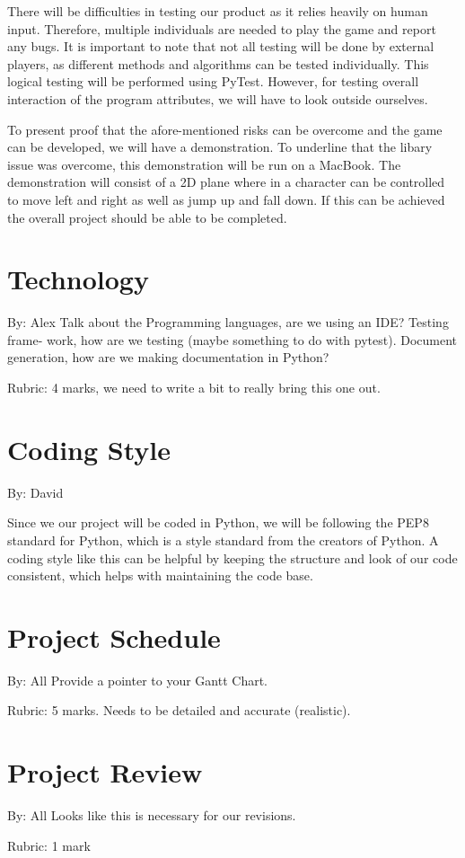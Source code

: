 \documentclass{article}
\begin{document}
There will be difficulties in testing our product as it relies heavily on human
input. Therefore, multiple individuals are needed to play the game and report
any bugs. It is important to note that not all testing will be done by external
players, as different methods and algorithms can be tested individually. This
logical testing will be performed using PyTest. However, for testing overall
interaction of the program attributes, we will have to look outside ourselves.

To present proof that the afore-mentioned risks can be overcome and the game can
be developed, we will have a demonstration. To underline that the libary issue
was overcome, this demonstration will be run on a MacBook. The demonstration
will consist of a 2D plane where in a character can be controlled to move left
and right as well as jump up and fall down. If this can be achieved the overall project should be able to be completed.

\section{Technology}
By: Alex
Talk  about  the  Programming  languages,  are  we  using  an  IDE?  Testing
frame-
work,  how  are  we  testing  (maybe  something  to  do  with  pytest).
Document
generation, how are we making documentation in Python?

Rubric:  4 marks, we need to write a bit to really bring this one out.

\section{Coding Style}
By: David

Since we our project will be coded in Python, we will be following the PEP8 
standard for Python, which is a style standard from the creators of Python.
A coding style like this can be helpful by keeping the structure and look of 
our code consistent, which helps with maintaining the code base.



\section{Project Schedule}
By: All
Provide a pointer to your Gantt Chart.

Rubric:  5 marks.  Needs to be detailed and accurate (realistic).

\section{Project Review}
By: All
Looks like this is necessary for our revisions.

Rubric:  1 mark
\end{document}
